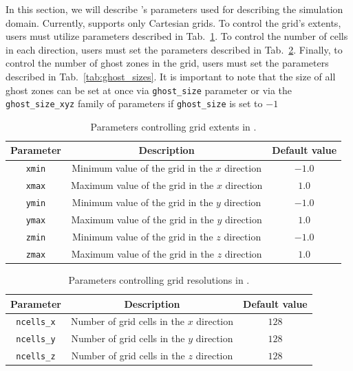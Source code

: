 In this section, we will describe \CarpetX's parameters used for describing the simulation domain. Currently, \CarpetX\space supports only Cartesian grids. To control the grid's extents, users must utilize parameters described in Tab.~\ref{tab:grid_sizes}. To control the number of cells in each direction, users must set the parameters described in Tab.~\ref{tab:num_cells}. Finally, to control the number of ghost zones in the grid, users must set the parameters described in Tab.~\ref{tab:ghost_sizes}. It is important to note that the size of all ghost zones can be set at once via \texttt{ghost\_size} parameter or via the \texttt{ghost\_size\_xyz} family of parameters if \texttt{ghost\_size} is set to $-1$

\begin{table}[ht]
  \centering
  \begin{tabular}{ccc}
  Parameter     & Description                                    & Default value \\\hline\hline
  \texttt{xmin} & Minimum value of the grid in the $x$ direction & $-1.0$        \\
  \texttt{xmax} & Maximum value of the grid in the $x$ direction & $1.0$         \\
  \texttt{ymin} & Minimum value of the grid in the $y$ direction & $-1.0$        \\
  \texttt{ymax} & Maximum value of the grid in the $y$ direction & $1.0$         \\
  \texttt{zmin} & Minimum value of the grid in the $z$ direction & $-1.0$        \\
  \texttt{zmax} & Maximum value of the grid in the $z$ direction & $1.0$         \\\hline\hline
  \end{tabular}
  \caption{Parameters controlling grid extents in \CarpetX.}
  \label{tab:grid_sizes}
\end{table}

\begin{table}[ht]
  \centering
  \begin{tabular}{ccc}
  Parameter          & Description                               & Default value \\\hline\hline
  \texttt{ncells\_x} & Number of grid cells in the $x$ direction & $128$         \\
  \texttt{ncells\_y} & Number of grid cells in the $y$ direction & $128$         \\
  \texttt{ncells\_z} & Number of grid cells in the $z$ direction & $128$         \\\hline\hline
  \end{tabular}
  \caption{Parameters controlling grid resolutions in \CarpetX.}
  \label{tab:num_cells}
\end{table}

